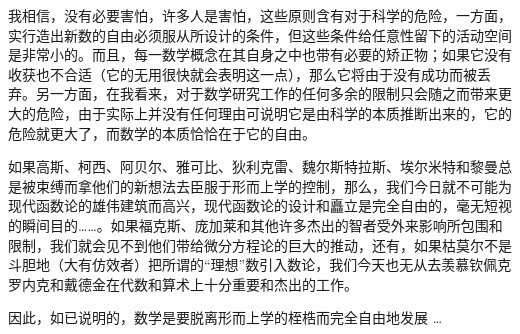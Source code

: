 我相信，没有必要害怕，许多人是害怕，这些原则含有对于科学的危险，一方面，实行造出新数的自由必须服从所设计的条件，但这些条件给任意性留下的活动空间是非常小的。而且，每一数学概念在其自身之中也带有必要的矫正物；如果它没有收获也不合适（它的无用很快就会表明这一点），那么它将由于没有成功而被丢弃。另一方面，在我看来，对于数学研究工作的任何多余的限制只会随之而带来更大的危险，由于实际上并没有任何理由可说明它是由科学的本质推断出来的，它的危险就更大了，而数学的本质恰恰在于它的自由。

如果高斯、柯西、阿贝尔、雅可比、狄利克雷、魏尔斯特拉斯、埃尔米特和黎曼总是被束缚而拿他们的新想法去臣服于形而上学的控制，那么，我们今日就不可能为现代函数论的雄伟建筑而高兴，现代函数论的设计和矗立是完全自由的，毫无短视的瞬间目的……。如果福克斯、庞加莱和其他许多杰出的智者受外来影响所包围和限制，我们就会见不到他们带给微分方程论的巨大的推动，还有，如果枯莫尔不是斗胆地（大有仿效者）把所谓的“理想”数引入数论，我们今天也无从去羡慕钦佩克罗内克和戴德金在代数和算术上十分重要和杰出的工作。

因此，如已说明的，数学是要脱离形而上学的桎梏而完全自由地发展 \dots



